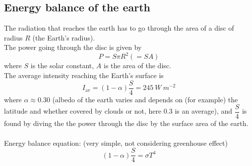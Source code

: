 \documentclass[a4paper,12pt]{article}
\begin{document}
\subsection{Energy balance of the earth}
\begin{center}
\end{center}
The radiation that reaches the earth has to go through the area of a disc of radius $R$ (the Earth's radius).\\
The power going through the disc is given by
\[P=S\pi R^2(=SA)\]
where $S$ is the solar constant, $A$ is the area of the disc.\\
The average intensity reaching the Earth's surface is 
\[I_\text{av}=(1-\alpha)\dfrac{S}{4}=245\ W\ m^{-2}\]
where $\alpha\approx 0.30$ (albedo of the earth varies and depends on (for example) the latitude and whether covered by clouds or not, here 0.3 is an average), and $\dfrac{S}{4}$ is found by diving the the power through the disc by the surface area of the earth.
\\\\Energy balance equation: (very simple, not considering greenhouse effect)
\[(1-\alpha)\dfrac{S}{4}=\sigma T^4\]
\end{document}
